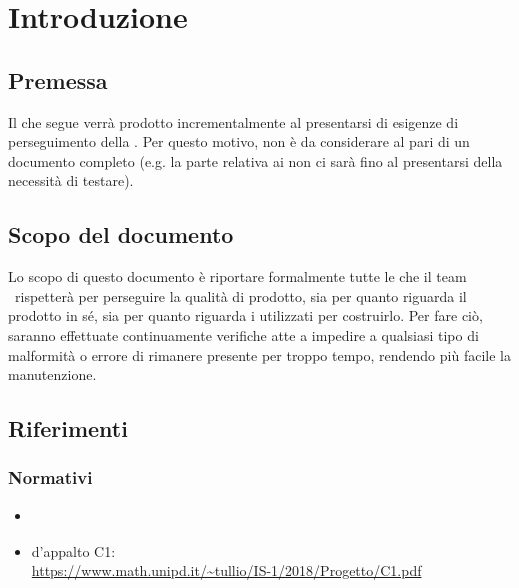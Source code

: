 \section{Introduzione}\label{Introduzione}

    

    \subsection{Premessa}
    Il  che segue verrà prodotto incrementalmente al presentarsi di esigenze di perseguimento della .
    Per questo motivo, non è da considerare al pari di un documento completo (e.g. la parte relativa ai non ci sarà fino
    al presentarsi della necessità di testare).

    \subsection{Scopo del documento}
    Lo scopo di questo documento è riportare formalmente tutte le  che il team \gruppo\ rispetterà per perseguire
    la qualità di prodotto, sia per quanto riguarda il prodotto in s\'e, sia per quanto riguarda i 
    utilizzati per costruirlo. Per fare ciò, saranno effettuate continuamente verifiche atte a impedire a qualsiasi tipo di malformità o errore
    di rimanere presente per troppo tempo, rendendo più facile la manutenzione.

    

    \subsection{Riferimenti}
	
	\subsubsection{Normativi}
    \begin{itemize}
    	\item \textit{\NdPv}
    	\item {} d'appalto C1:\\ \url{https://www.math.unipd.it/~tullio/IS-1/2018/Progetto/C1.pdf}
    \end{itemize}
    
